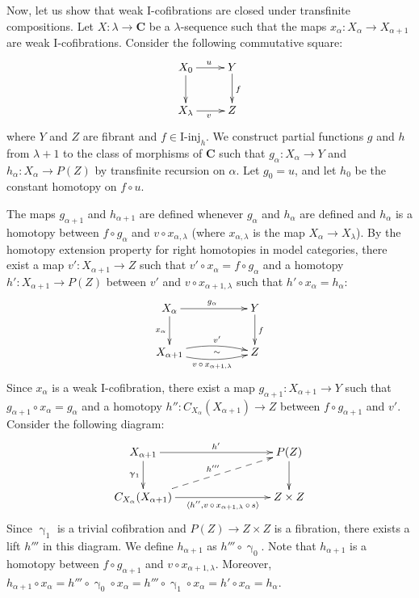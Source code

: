 \documentclass{tac}
\theoremstyle{definition}
\newcommand{\cat}[1]{\mathbf{#1}}
\newcommand{\C}{\cat{C}}
\newcommand{\I}{\mathrm{I}}
\newcommand{\class}[2]{#1\text{-}\mathrm{#2}}
\newcommand{\Iinj}[1][\I]{\class{#1}{inj}}
\newcommand{\cyli}{\upgamma}
\begin{document}
Now, let us show that weak $\I$-cofibrations are closed under transfinite compositions.
Let $X : \lambda \to \C$ be a $\lambda$-sequence such that the maps $x_\alpha : X_\alpha \to X_{\alpha+1}$ are weak $\I$-cofibrations.
Consider the following commutative square:
\[ \xymatrix{ X_0 \ar[r]^u \ar[d] & Y \ar[d]^f \\
              X_\lambda \ar[r]_v & Z
            } \]
where $Y$ and $Z$ are fibrant and $f \in \Iinj_h$.
We construct partial functions $g$ and $h$ from $\lambda+1$ to the class of morphisms of $\C$
such that $g_\alpha : X_\alpha \to Y$ and $h_\alpha : X_\alpha \to P(Z)$ by transfinite recursion on $\alpha$.
Let $g_0 = u$, and let $h_0$ be the constant homotopy on $f \circ u$.

The maps $g_{\alpha+1}$ and $h_{\alpha+1}$ are defined whenever $g_\alpha$ and $h_\alpha$ are defined and
$h_\alpha$ is a homotopy between $f \circ g_\alpha$ and $v \circ x_{\alpha,\lambda}$ (where $x_{\alpha,\lambda}$ is the map $X_\alpha \to X_\lambda$).
By the homotopy extension property for right homotopies in model categories, there exist a map $v' : X_{\alpha+1} \to Z$ such that $v' \circ x_\alpha = f \circ g_\alpha$
and a homotopy $h' : X_{\alpha+1} \to P(Z)$ between $v'$ and $v \circ x_{\alpha+1,\lambda}$ such that $h' \circ x_\alpha = h_\alpha$:
\[ \xymatrix{ X_\alpha \ar[rr]^{g_\alpha} \ar[d]_{x_\alpha}                                                & & Y \ar[d]^f \\
              X_{\alpha+1} \ar@/^/[rr]^-{v'} \ar@/_/[rr]_{v\,\circ\,x_{\alpha+1,\lambda}} \ar@{}[rr]|-{\sim} & & Z
            } \]
Since $x_\alpha$ is a weak $\I$-cofibration, there exist a map $g_{\alpha+1} : X_{\alpha+1} \to Y$ such that $g_{\alpha+1} \circ x_\alpha = g_\alpha$
and a homotopy $h'' : C_{X_\alpha}(X_{\alpha+1}) \to Z$ between $f \circ g_{\alpha+1}$ and $v'$.
Consider the following diagram:
\[ \xymatrix{ X_{\alpha+1} \ar[rrr]^{h'} \ar[d]_{\cyli_1}                                                                                 & & & P(Z) \ar[d] \\
              C_{X_\alpha}(X_{\alpha+1}) \ar[rrr]_-{\langle h'', v\,\circ\,x_{\alpha+1,\lambda}\,\circ\,s \rangle} \ar@{-->}[rrru]^{h'''} & & & Z \times Z
            } \]
Since $\cyli_1$ is a trivial cofibration and $P(Z) \to Z \times Z$ is a fibration, there exists a lift $h'''$ in this diagram.
We define $h_{\alpha+1}$ as $h''' \circ \cyli_0$.
Note that $h_{\alpha+1}$ is a homotopy between $f \circ g_{\alpha+1}$ and $v \circ x_{\alpha+1,\lambda}$.
Moreover, $h_{\alpha+1} \circ x_\alpha = h''' \circ \cyli_0 \circ x_\alpha = h''' \circ \cyli_1 \circ x_\alpha = h' \circ x_\alpha = h_\alpha$.
\end{document}
